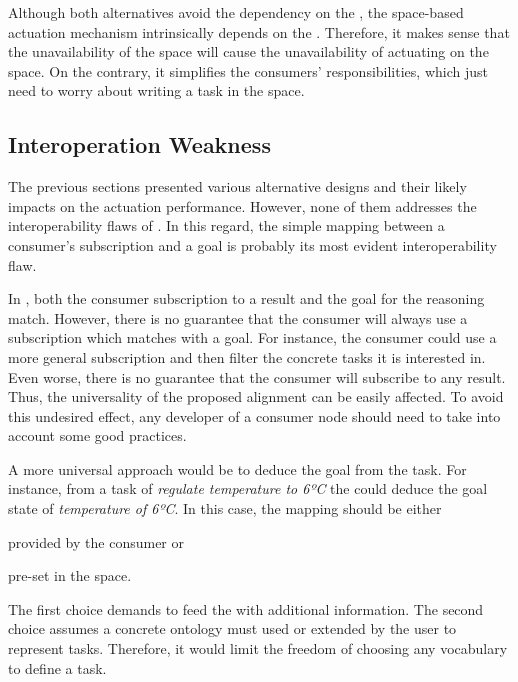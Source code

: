 Although both alternatives avoid the dependency on the \Space{}, the space-based actuation mechanism intrinsically depends on the \Space{}.
Therefore, it makes sense that the unavailability of the space will cause the unavailability of actuating on the space.
On the contrary, it simplifies the consumers' responsibilities, which just need to worry about writing a task in the space.



\subsection{Interoperation Weakness}

The previous sections presented various alternative designs and their likely impacts on the actuation performance.
However, none of them addresses the interoperability flaws of \implMix{}.
In this regard, the simple mapping between a consumer's subscription and a goal is probably its most evident interoperability flaw.


In \implMix{}, both the consumer subscription to a result and the goal for the reasoning match.
However, there is no guarantee that the consumer will always use a subscription which matches with a goal.
For instance, the consumer could use a more general subscription and then filter the concrete tasks it is interested in.
Even worse, there is no guarantee that the consumer will subscribe to any result.
Thus, the universality of the proposed alignment can be easily affected.
To avoid this undesired effect, any developer of a consumer node should need to take into account some good practices. %


A more universal approach would be to deduce the goal from the task. %
For instance, from a task of \emph{regulate temperature to 6ºC} the \Space{} could deduce the goal state of \emph{temperature of 6ºC}.
In this case, the mapping should be either
\begin{enumerate*}[label=\itshape(\arabic*\upshape)]
  \item provided by the consumer or
  \item pre-set in the space.
\end{enumerate*}
The first choice demands to feed the \Space{} with additional information. %
The second choice assumes a concrete ontology must used or extended by the user to represent tasks.
Therefore, it would limit the freedom of choosing any vocabulary to define a task.


